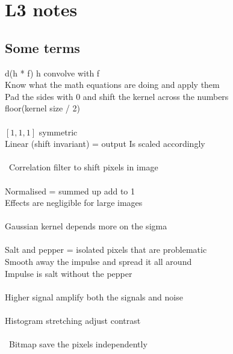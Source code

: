 \documentclass[11pt]{article}
\begin{document}
\noindent
\section*{L3 notes}
\subsection*{Some terms}
d(h * f) h convolve with f \\
Know what the math equations are doing and apply them\\
Pad the sides with 0 and shift the kernel across the numbers\\
floor(kernel size / 2)\\\\
$[1,1,1 ]$ symmetric\\
Linear (shift invariant) = output Is scaled accordingly\\
\\
\
Correlation filter to shift pixels in image
\\\\
Normalised = summed up add to 1\\
Effects are negligible for large images\\\\
Gaussian kernel depends more on the sigma\\\\
Salt and pepper = isolated pixels that are problematic\\
Smooth away the impulse and spread it all around\\
Impulse is salt without the pepper\\\\
Higher signal amplify both the signals and noise
\\\\
Histogram stretching adjust contrast\\\\
\
Bitmap save the pixels independently\\
\end{document}
